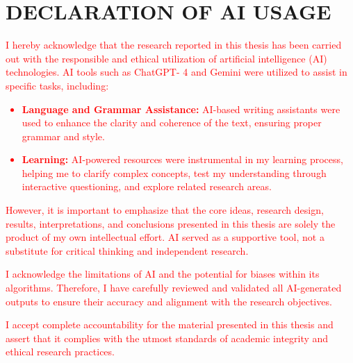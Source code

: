 \newpage
\section*{DECLARATION OF AI USAGE}


\textcolor{red}{I hereby acknowledge that the research reported in this thesis has been carried out with the responsible and ethical utilization of artificial intelligence (AI) technologies. AI tools such as ChatGPT- 4 and Gemini were utilized to assist in specific tasks, including:}

\textcolor{red}{
\begin{itemize}
    \item \textbf{Language and Grammar Assistance:} AI-based writing assistants were used to enhance the clarity and coherence of the text, ensuring proper grammar and style.
    \item \textbf{Learning:} AI-powered resources were instrumental in my learning process, helping me to clarify complex concepts, test my understanding through interactive questioning, and explore related research areas.
\end{itemize}
}

\textcolor{red}{However, it is important to emphasize that the core ideas, research design, results, interpretations, and conclusions presented in this thesis are solely the product of my own intellectual effort. AI served as a supportive tool, not a substitute for critical thinking and independent research.}

\textcolor{red}{I acknowledge the limitations of AI and the potential for biases within its algorithms. Therefore, I have carefully reviewed and validated all AI-generated outputs to ensure their accuracy and alignment with the research objectives.}

\textcolor{red}{I accept complete accountability for the material presented in this thesis and assert that it complies with the utmost standards of academic integrity and ethical research practices.
}